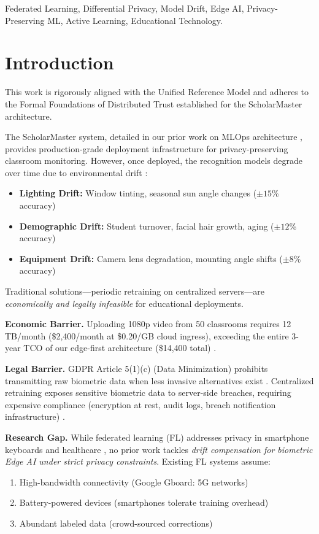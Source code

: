 \documentclass[conference]{IEEEtran}
\begin{document}
\begin{IEEEkeywords}
Federated Learning, Differential Privacy, Model Drift, Edge AI, Privacy-Preserving ML, Active Learning, Educational Technology.
\end{IEEEkeywords}

\section{Introduction} This work is rigorously aligned with the Unified Reference Model \cite{P20} and adheres to the Formal Foundations of Distributed Trust \cite{P21} established for the ScholarMaster architecture.

The ScholarMaster system, detailed in our prior work on MLOps architecture \cite{b1}, provides production-grade deployment infrastructure for privacy-preserving classroom monitoring. However, once deployed, the recognition models degrade over time due to environmental drift \cite{b2}:

\begin{itemize}
    \item \textbf{Lighting Drift:} Window tinting, seasonal sun angle changes ($\pm 15$\% accuracy)
    \item \textbf{Demographic Drift:} Student turnover, facial hair growth, aging ($\pm 12$\% accuracy)
    \item \textbf{Equipment Drift:} Camera lens degradation, mounting angle shifts ($\pm 8$\% accuracy)
\end{itemize}

Traditional solutions—periodic retraining on centralized servers—are \textit{economically and legally infeasible} for educational deployments.

\textbf{Economic Barrier.} Uploading 1080p video from 50 classrooms requires 12 TB/month (\$2,400/month at \$0.20/GB cloud ingress), exceeding the entire 3-year TCO of our edge-first architecture (\$14,400 total) \cite{b3}.

\textbf{Legal Barrier.} GDPR Article 5(1)(c) (Data Minimization) prohibits transmitting raw biometric data when less invasive alternatives exist \cite{b4}. Centralized retraining exposes sensitive biometric data to server-side breaches, requiring expensive compliance (encryption at rest, audit logs, breach notification infrastructure) \cite{b5}.

\textbf{Research Gap.} While federated learning (FL) addresses privacy in smartphone keyboards \cite{b6} and healthcare \cite{b7}, no prior work tackles \textit{drift compensation for biometric Edge AI under strict privacy constraints}. Existing FL systems assume:
\begin{enumerate}
    \item High-bandwidth connectivity (Google Gboard: 5G networks) \cite{b8}
    \item Battery-powered devices (smartphones tolerate training overhead)
    \item Abundant labeled data (crowd-sourced corrections)
\end{enumerate}
\end{document}
